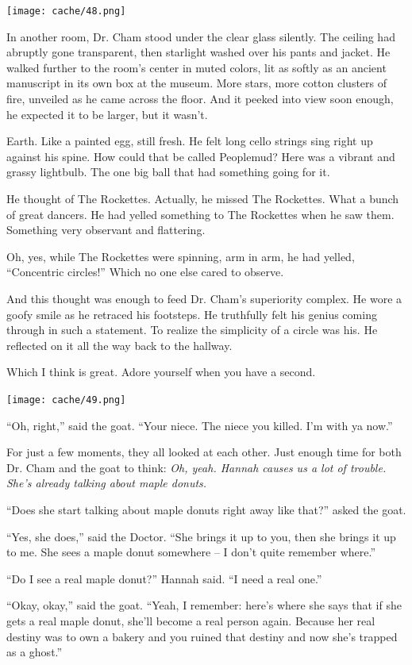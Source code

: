 \documentclass[12pt,twoside]{report}
\begin{document}
	\texttt{[image: cache/48.png]}

In another room, Dr. Cham stood under the clear glass silently.  The
ceiling had abruptly gone transparent, then starlight washed over his
pants and jacket.  He walked further to the room's center in muted
colors, lit as softly as an ancient manuscript in its own box at the
museum.  More stars, more cotton clusters of fire, unveiled as he came
across the floor. And it peeked into view soon enough, he expected it
to be larger, but it wasn't.

Earth.  Like a painted egg, still fresh.  He felt long cello strings
sing right up against his spine.  How could that be called Peoplemud?
Here was a vibrant and grassy lightbulb.  The one big ball that had
something going for it.

He thought of The Rockettes.  Actually, he missed The Rockettes.  What
a bunch of great dancers.  He had yelled something to The Rockettes
when he saw them.  Something very observant and flattering.

Oh, yes, while The Rockettes were spinning, arm in arm, he had yelled,
``Concentric circles!'' Which no one else cared to observe.

And this thought was enough to feed Dr. Cham's superiority complex.
He wore a goofy smile as he retraced his footsteps.  He truthfully
felt his genius coming through in such a statement.  To realize the
simplicity of a circle was his.  He reflected on it all the way back
to the hallway.

Which I think is great.  Adore yourself when you have a second.

	\texttt{[image: cache/49.png]}

``Oh, right,'' said the goat.  ``Your niece.  The niece you killed.
        I'm with ya now.''

For just a few moments, they all looked at each other.  Just enough
time for both Dr. Cham and the goat to think: {\em Oh, yeah.  Hannah
  causes us a lot of trouble.  She's already talking about maple
  donuts.}

``Does she start talking about maple donuts right away like that?''
asked the goat.

``Yes, she does,'' said the Doctor.  ``She brings it up to you, then
she brings it up to me.  She sees a maple donut somewhere -- I don't
quite remember where.''

``Do I see a real maple donut?'' Hannah said.  ``I need a real one.''

``Okay, okay,'' said the goat.  ``Yeah, I remember: here's where she
says that if she gets a real maple donut, she'll become a real person
again. Because her real destiny was to own a bakery and you ruined
that destiny and now she's trapped as a ghost.''
\end{document}
